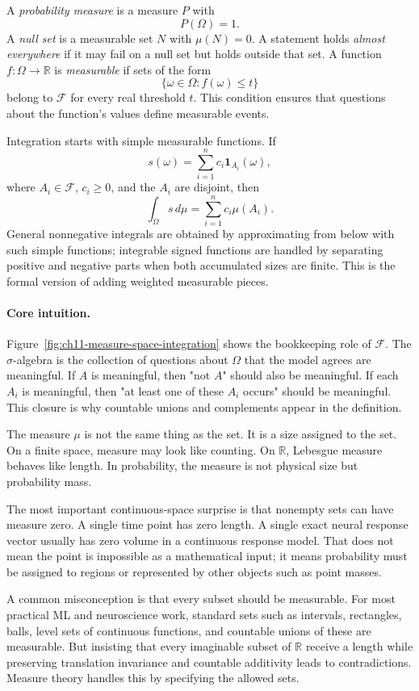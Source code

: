 A \emph{probability measure} is a measure \(P\) with
\[
P(\Omega)=1.
\]
A \emph{null set} is a measurable set \(N\) with \(\mu(N)=0\). A statement holds \emph{almost everywhere} if it may fail on a null set but holds outside that set. A function \(f:\Omega\to\mathbb{R}\) is \emph{measurable} if sets of the form
\[
\{\omega\in\Omega:f(\omega)\leq t\}
\]
belong to \(\mathcal{F}\) for every real threshold \(t\). This condition ensures that questions about the function's values define measurable events.

Integration starts with simple measurable functions. If
\[
s(\omega)=\sum_{i=1}^n c_i\mathbf{1}_{A_i}(\omega),
\]
where \(A_i\in\mathcal{F}\), \(c_i\geq0\), and the \(A_i\) are disjoint, then
\[
\int_\Omega s\,d\mu
=
\sum_{i=1}^n c_i\mu(A_i).
\]
General nonnegative integrals are obtained by approximating from below with such simple functions; integrable signed functions are handled by separating positive and negative parts when both accumulated sizes are finite. This is the formal version of adding weighted measurable pieces.

\paragraph{Core intuition.}
Figure~\ref{fig:ch11-measure-space-integration} shows the bookkeeping role of \(\mathcal{F}\). The \(\sigma\)-algebra is the collection of questions about \(\Omega\) that the model agrees are meaningful. If \(A\) is meaningful, then "not \(A\)" should also be meaningful. If each \(A_i\) is meaningful, then "at least one of these \(A_i\) occurs" should be meaningful. This closure is why countable unions and complements appear in the definition.

The measure \(\mu\) is not the same thing as the set. It is a size assigned to the set. On a finite space, measure may look like counting. On \(\mathbb{R}\), Lebesgue measure behaves like length. In probability, the measure is not physical size but probability mass.

The most important continuous-space surprise is that nonempty sets can have measure zero. A single time point has zero length. A single exact neural response vector usually has zero volume in a continuous response model. That does not mean the point is impossible as a mathematical input; it means probability must be assigned to regions or represented by other objects such as point masses.

A common misconception is that every subset should be measurable. For most practical ML and neuroscience work, standard sets such as intervals, rectangles, balls, level sets of continuous functions, and countable unions of these are measurable. But insisting that every imaginable subset of \(\mathbb{R}\) receive a length while preserving translation invariance and countable additivity leads to contradictions. Measure theory handles this by specifying the allowed sets.

